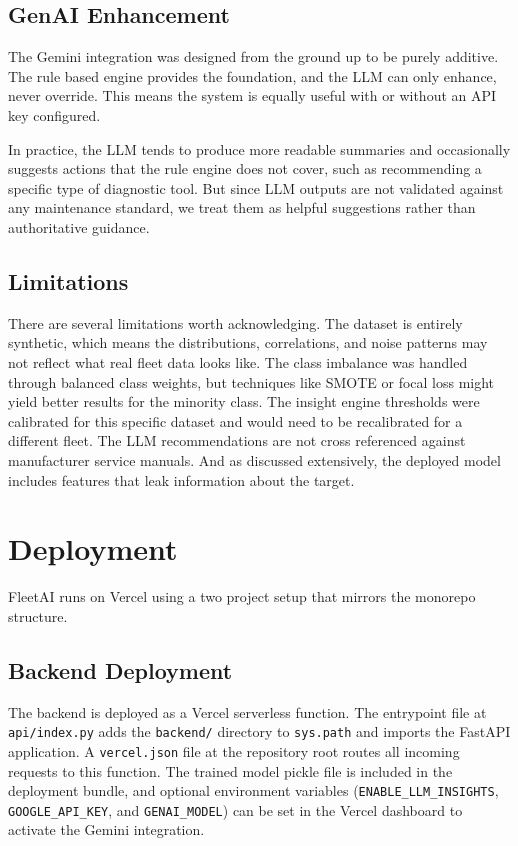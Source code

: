 \documentclass[conference]{IEEEtran}
\begin{document}
\subsection{GenAI Enhancement}

The Gemini integration was designed from the ground up to be purely additive. The rule based engine provides the foundation, and the LLM can only enhance, never override. This means the system is equally useful with or without an API key configured.

In practice, the LLM tends to produce more readable summaries and occasionally suggests actions that the rule engine does not cover, such as recommending a specific type of diagnostic tool. But since LLM outputs are not validated against any maintenance standard, we treat them as helpful suggestions rather than authoritative guidance.

\subsection{Limitations}

There are several limitations worth acknowledging. The dataset is entirely synthetic, which means the distributions, correlations, and noise patterns may not reflect what real fleet data looks like. The class imbalance was handled through balanced class weights, but techniques like SMOTE or focal loss might yield better results for the minority class. The insight engine thresholds were calibrated for this specific dataset and would need to be recalibrated for a different fleet. The LLM recommendations are not cross referenced against manufacturer service manuals. And as discussed extensively, the deployed model includes features that leak information about the target.

\section{Deployment}

FleetAI runs on Vercel using a two project setup that mirrors the monorepo structure.

\subsection{Backend Deployment}
The backend is deployed as a Vercel serverless function. The entrypoint file at \texttt{api/index.py} adds the \texttt{backend/} directory to \texttt{sys.path} and imports the FastAPI application. A \texttt{vercel.json} file at the repository root routes all incoming requests to this function. The trained model pickle file is included in the deployment bundle, and optional environment variables (\texttt{ENABLE\_LLM\_INSIGHTS}, \texttt{GOOGLE\_API\_KEY}, and \texttt{GENAI\_MODEL}) can be set in the Vercel dashboard to activate the Gemini integration.
\end{document}
